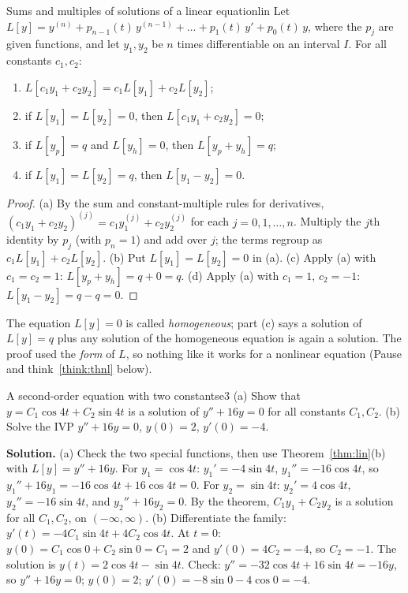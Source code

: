 \documentclass[11pt]{article}
\begin{document}
\begin{thm}{Sums and multiples of solutions of a linear equation}{lin}
Let $L[y]=y^{(n)}+p_{n-1}(t)\,y^{(n-1)}+\dots+p_1(t)\,y'+p_0(t)\,y$, where the $p_j$ are given functions, and let $y_1,y_2$ be $n$ times differentiable on an interval $I$. For all constants $c_1,c_2$:
\begin{enumerate}[label=(\alph*),nosep]
  \item $L[c_1y_1+c_2y_2]=c_1L[y_1]+c_2L[y_2]$;
  \item if $L[y_1]=L[y_2]=0$, then $L[c_1y_1+c_2y_2]=0$;
  \item if $L[y_p]=q$ and $L[y_h]=0$, then $L[y_p+y_h]=q$;
  \item if $L[y_1]=L[y_2]=q$, then $L[y_1-y_2]=0$.
\end{enumerate}
\end{thm}
\begin{proof}
(a) By the sum and constant-multiple rules for derivatives, $(c_1y_1+c_2y_2)^{(j)}=c_1y_1^{(j)}+c_2y_2^{(j)}$ for each $j=0,1,\dots,n$. Multiply the $j$th identity by $p_j$ (with $p_n=1$) and add over $j$; the terms regroup as $c_1L[y_1]+c_2L[y_2]$.
(b) Put $L[y_1]=L[y_2]=0$ in (a). (c) Apply (a) with $c_1=c_2=1$: $L[y_p+y_h]=q+0=q$. (d) Apply (a) with $c_1=1$, $c_2=-1$: $L[y_1-y_2]=q-q=0$.
\end{proof}

The equation $L[y]=0$ is called \emph{homogeneous}; part (c) says a solution of $L[y]=q$ plus any solution of the homogeneous equation is again a solution. The proof used the \emph{form} of $L$, so nothing like it works for a nonlinear equation (Pause and think~\ref{think:thnl} below).

\begin{exmp}{A second-order equation with two constants}{e3}
(a) Show that $y=C_1\cos4t+C_2\sin4t$ is a solution of $y''+16y=0$ for all constants $C_1,C_2$. (b) Solve the IVP $y''+16y=0$, $y(0)=2$, $y'(0)=-4$.

\textbf{Solution.} (a) Check the two special functions, then use Theorem~\ref{thm:lin}(b) with $L[y]=y''+16y$. For $y_1=\cos4t$: $y_1'=-4\sin4t$, $y_1''=-16\cos4t$, so $y_1''+16y_1=-16\cos4t+16\cos4t=0$. For $y_2=\sin4t$: $y_2'=4\cos4t$, $y_2''=-16\sin4t$, and $y_2''+16y_2=0$.
By the theorem, $C_1y_1+C_2y_2$ is a solution for all $C_1,C_2$, on $(-\infty,\infty)$.
(b) Differentiate the family: $y'(t)=-4C_1\sin4t+4C_2\cos4t$. At $t=0$: $y(0)=C_1\cos0+C_2\sin0=C_1=2$ and $y'(0)=4C_2=-4$, so $C_2=-1$. The solution is $y(t)=2\cos4t-\sin4t$. Check: $y''=-32\cos4t+16\sin4t=-16y$, so $y''+16y=0$; $y(0)=2$; $y'(0)=-8\sin0-4\cos0=-4$.
\end{exmp}
\end{document}
